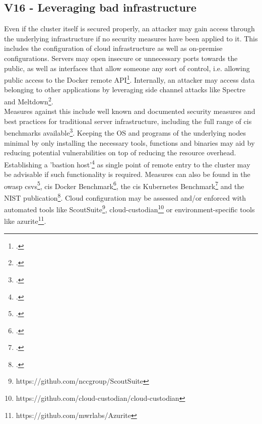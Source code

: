 
\newpage
\subsection{V16 - Leveraging bad infrastructure} \label{v16}
Even if the cluster itself is secured properly, an attacker may gain access through the underlying infrastructure if no security measures have been applied to it.
This includes the configuration of cloud infrastructure as well as on-premise configurations.
Servers may open insecure or unnecessary ports towards the public, as well as interfaces that allow someone any sort of control, i.e. allowing public access to the Docker remote API\footcite[][, section 'Publicly Accessible Docker Hosts']{dockerRemoteAccess}.
Internally, an attacker may access data belonging to other applications by leveraging side channel attacks like Spectre and Meltdown\footcite[][, section 'Which cloud providers are affected by Meltdown?']{spectreMeltdown}. \\
Measures against this include well known and documented security measures and best practices for traditional server infrastructure, including the full range of \gls{cis} benchmarks available\footcite[][, refer to the list presented]{cisBenchmarkList}.
Keeping the OS and programs of the underlying nodes minimal by only installing the necessary tools, functions and binaries may aid by reducing potential vulnerabilities on top of reducing the resource overhead.
Establishing a 'bastion host'\footcite[][, section 'What is a bastion host, and do I need one?']{bastionHostAws} as single point of remote entry to the cluster may be advisable if such functionality is required.
Measures can also be found in the \gls{owasp} \gls{csvs}\footcite[][, section 'Infrastructure']{csvsGithub}, \gls{cis} Docker Benchmark\footcite[][, chapters 1 through 3 and 5]{cisDocker}, the \gls{cis} Kubernetes Benchmark\footcite[][, chapters 'Worker Node Security Configuration' and 'Configuration Files']{cisK8s} and the NIST publication\footcite[][, chapters 3.5, 4.5 and 4.6]{nistK8s}.
Cloud configuration may be assessed and/or enforced with automated tools like ScoutSuite\footnote{https://github.com/nccgroup/ScoutSuite},
\renewcommand*{\thefootnote}{\roman{footnote}}
\setcounter{footnote}{0}
 cloud-custodian\footnote{https://github.com/cloud-custodian/cloud-custodian} or environment-specific tools like azurite\footnote{https://github.com/mwrlabs/Azurite}.

\newpage
\renewcommand*{\thefootnote}{\arabic{footnote}}
\setcounter{footnote}{0}
